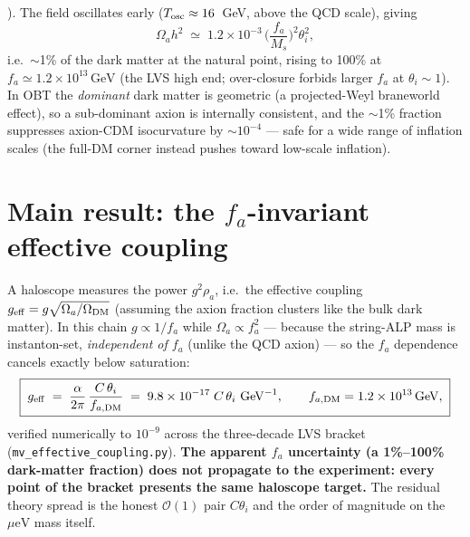 \documentclass[11pt]{article}
\newcommand{\geff}{g_{\mathrm{eff}}}
\newcommand{\ueV}{\mu\mathrm{eV}}
\newcommand{\GeV}{\mathrm{GeV}}
\begin{document}
\begin{enumerate}
\cite{PWW1983}). The field oscillates early ($T_{\rm osc} \approx 16$~GeV, above the QCD scale),
giving
\begin{equation}
\Omega_a h^2 \;\simeq\; 1.2\times10^{-3}\,\Big(\frac{f_a}{M_s}\Big)^{2}\theta_i^{2},
\end{equation}
i.e.\ $\sim$1\% of the dark matter at the natural point, rising to 100\% at
$f_a \simeq 1.2\times10^{13}\,\GeV$ (the LVS high end; over-closure forbids larger $f_a$ at
$\theta_i\sim1$). In OBT the \emph{dominant} dark matter is geometric (a projected-Weyl braneworld
effect), so a sub-dominant axion is internally consistent, and the $\sim$1\% fraction suppresses
axion-CDM isocurvature by $\sim\!10^{-4}$ --- safe for a wide range of inflation scales (the full-DM
corner instead pushes toward low-scale inflation).
\end{enumerate}

\section{Main result: the $f_a$-invariant effective coupling}
\label{sec:invariance}
A haloscope measures the power $g^2\rho_a$, i.e.\ the effective coupling
$\geff = g\sqrt{\Omega_a/\Omega_{\rm DM}}$ (assuming the axion fraction clusters like the bulk dark
matter). In this chain $g \propto 1/f_a$ while $\Omega_a \propto f_a^2$ --- because the string-ALP
mass is instanton-set, \emph{independent of $f_a$} (unlike the QCD axion) --- so the $f_a$ dependence
cancels exactly below saturation:
\begin{equation}
\boxed{\;\geff \;=\; \frac{\alpha}{2\pi}\,\frac{C\,\theta_i}{f_{a,\rm DM}}
\;=\; 9.8\times10^{-17}\; C\,\theta_i\ \GeV^{-1},\qquad
f_{a,\rm DM} = 1.2\times10^{13}\,\GeV,\;}
\label{eq:inv}
\end{equation}
verified numerically to $10^{-9}$ across the three-decade LVS bracket
(\texttt{mv\_effective\_coupling.py}). \textbf{The apparent $f_a$ uncertainty (a 1\%--100\%
dark-matter fraction) does not propagate to the experiment: every point of the bracket presents the
same haloscope target.} The residual theory spread is the honest $\mathcal{O}(1)$ pair $C\theta_i$
and the order of magnitude on the $\ueV$ mass itself.
\end{document}
